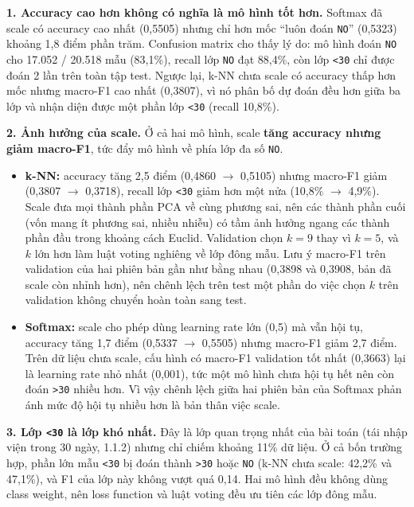 \documentclass[a4paper]{report}
\begin{document}
\textbf{1. Accuracy cao hơn không có nghĩa là mô hình tốt hơn.} Softmax đã scale có accuracy cao nhất (0,5505) nhưng chỉ hơn mốc “luôn đoán \texttt{NO}” (0,5323) khoảng 1,8 điểm phần trăm. Confusion matrix cho thấy lý do: mô hình đoán \texttt{NO} cho 17.052 / 20.518 mẫu (83,1\%), recall lớp \texttt{NO} đạt 88,4\%, còn lớp \texttt{<30} chỉ được đoán 2 lần trên toàn tập test. Ngược lại, k-NN chưa scale có accuracy thấp hơn mốc nhưng macro-F1 cao nhất (0,3807), vì nó phân bố dự đoán đều hơn giữa ba lớp và nhận diện được một phần lớp \texttt{<30} (recall 10,8\%).

\textbf{2. Ảnh hưởng của scale.} Ở cả hai mô hình, scale \textbf{tăng accuracy nhưng giảm macro-F1}, tức đẩy mô hình về phía lớp đa số \texttt{NO}.

\begin{itemize}
  \item \textbf{k-NN:} accuracy tăng 2,5 điểm (0,4860 $\rightarrow$ 0,5105) nhưng macro-F1 giảm (0,3807 $\rightarrow$ 0,3718), recall lớp \texttt{<30} giảm hơn một nửa (10,8\% $\rightarrow$ 4,9\%). Scale đưa mọi thành phần PCA về cùng phương sai, nên các thành phần cuối (vốn mang ít phương sai, nhiều nhiễu) có tầm ảnh hưởng ngang các thành phần đầu trong khoảng cách Euclid. Validation chọn $k = 9$ thay vì $k = 5$, và $k$ lớn hơn làm luật voting nghiêng về lớp đông mẫu. Lưu ý macro-F1 trên validation của hai phiên bản gần như bằng nhau (0,3898 và 0,3908, bản đã scale còn nhỉnh hơn), nên chênh lệch trên test một phần do việc chọn $k$ trên validation không chuyển hoàn toàn sang test.
  \item \textbf{Softmax:} scale cho phép dùng learning rate lớn (0,5) mà vẫn hội tụ, accuracy tăng 1,7 điểm (0,5337 $\rightarrow$ 0,5505) nhưng macro-F1 giảm 2,7 điểm. Trên dữ liệu chưa scale, cấu hình có macro-F1 validation tốt nhất (0,3663) lại là learning rate nhỏ nhất (0,001), tức một mô hình chưa hội tụ hết nên còn đoán \texttt{>30} nhiều hơn. Vì vậy chênh lệch giữa hai phiên bản của Softmax phản ánh mức độ hội tụ nhiều hơn là bản thân việc scale.
\end{itemize}

\textbf{3. Lớp \texttt{<30} là lớp khó nhất.} Đây là lớp quan trọng nhất của bài toán (tái nhập viện trong 30 ngày, 1.1.2) nhưng chỉ chiếm khoảng 11\% dữ liệu. Ở cả bốn trường hợp, phần lớn mẫu \texttt{<30} bị đoán thành \texttt{>30} hoặc \texttt{NO} (k-NN chưa scale: 42,2\% và 47,1\%), và F1 của lớp này không vượt quá 0,14. Hai mô hình đều không dùng class weight, nên loss function và luật voting đều ưu tiên các lớp đông mẫu.
\end{document}
